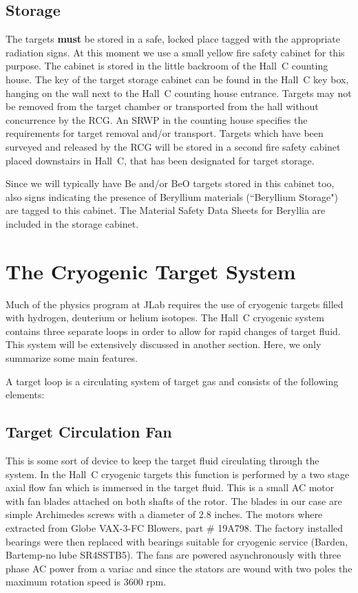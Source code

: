 \subsection{Storage}

The targets {\bf must} be stored in a safe, locked place tagged with the
appropriate radiation signs. At this moment we use a small yellow
fire safety cabinet for this purpose. The cabinet is stored in the
little backroom of the Hall~C counting house. The key of the target
storage cabinet can be found in the Hall~C key box, hanging on the
wall next to the Hall~C counting house entrance.
Targets may not be removed from the target chamber or transported from the hall without 
concurrence by the RCG.  An SRWP in the counting house specifies the requirements for 
target removal and/or transport.  Targets which have been surveyed and released by the 
RCG will be stored in a second fire safety cabinet placed downstairs in Hall~C,
that has been designated for target storage.

Since we will typically have
Be and/or BeO targets stored in this cabinet too, also signs indicating
the presence of Beryllium materials (``Beryllium Storage")
are tagged to this cabinet. The Material
Safety Data Sheets for Beryllia are included in the storage cabinet.


\section{The Cryogenic Target System}

Much of the physics program at JLab requires the use of cryogenic targets
filled with hydrogen, deuterium or helium isotopes. The Hall~C cryogenic
system contains three separate loops in order to allow for rapid changes
of target fluid.  This system will be extensively discussed in
another section.  Here, we only summarize some main features.

A target loop is a circulating system of target gas and consists of the following
elements:

\subsection{Target Circulation Fan} This is some sort of device to keep
the target fluid circulating through the system. In the Hall~C cryogenic
targets this function is performed by a two stage axial flow fan which is
immersed in the target fluid. This is a small AC motor with fan blades attached
on both shafts of the rotor. The blades in our case are simple Archimedes
screws with a diameter of 2.8 inches. The motors where extracted from Globe
VAX-3-FC Blowers, part $\#$ 19A798. The factory installed
bearings were then replaced with bearings suitable for cryogenic service
(Barden, Bartemp-no lube SR4SSTB5). The fans are powered asynchronously
with three phase AC power from a variac and since the stators are wound with
two poles the maximum rotation speed is 3600 rpm.
